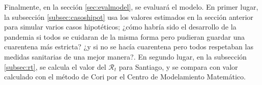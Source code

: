 Finalmente, en la sección \ref{sec:evalmodel}, se evaluará el modelo. En primer lugar, la subsección \ref{subsec:casoshipot} usa los valores estimados en la sección anterior para simular varios casos hipotéticos; ¿cómo habría sido el desarrollo de la pandemia si todos se cuidaran de la misma forma pero pudieran guardar una cuarentena más estricta? ¿y si no se hacía cuarentena pero todos respetaban las medidas sanitarias de una mejor manera?. En segundo lugar, en la subsección \ref{subsec:rt}, se calcula el valor del \(\mathcal{R}_t\) para Santiago, y se compara con valor calculado con el método de Cori \cite{Cori2013} por el Centro de Modelamiento Matemático.











